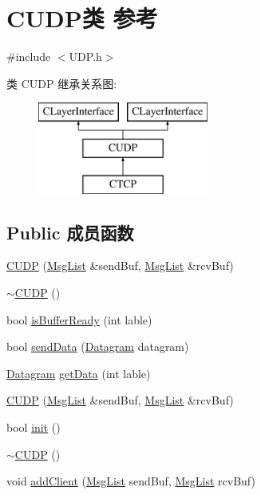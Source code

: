 \hypertarget{class_c_u_d_p}{}\section{C\+U\+D\+P类 参考}
\label{class_c_u_d_p}


{\ttfamily \#include $<$U\+D\+P.\+h$>$}

类 C\+U\+DP 继承关系图\+:\begin{figure}[H]
\begin{center}
\leavevmode
\includegraphics[height=3.000000cm]{class_c_u_d_p}
\end{center}
\end{figure}
\subsection*{Public 成员函数}
\begin{DoxyCompactItemize}
\item 
\hyperlink{class_c_u_d_p_a2eed7862494fbdc41005e5f536d2f74f}{C\+U\+DP} (\hyperlink{class_msg_list}{Msg\+List} \&send\+Buf, \hyperlink{class_msg_list}{Msg\+List} \&rcv\+Buf)
\item 
\hyperlink{class_c_u_d_p_aa5e4b24a48885c739893d60ffb10672f}{$\sim$\+C\+U\+DP} ()
\item 
bool \hyperlink{class_c_u_d_p_af595428bc531576d9859a9e0b84d03d9}{is\+Buffer\+Ready} (int lable)
\item 
bool \hyperlink{class_c_u_d_p_a1f6e555ad4997b283e68ebfa7dc0d263}{send\+Data} (\hyperlink{class_datagram}{Datagram} datagram)
\item 
\hyperlink{class_datagram}{Datagram} \hyperlink{class_c_u_d_p_aa71e49c760769b55dc2251b244eb00ff}{get\+Data} (int lable)
\item 
\hyperlink{class_c_u_d_p_a2eed7862494fbdc41005e5f536d2f74f}{C\+U\+DP} (\hyperlink{class_msg_list}{Msg\+List} \&send\+Buf, \hyperlink{class_msg_list}{Msg\+List} \&rcv\+Buf)
\item 
bool \hyperlink{class_c_u_d_p_a08619144028e752736166988369598c4}{init} ()
\item 
\hyperlink{class_c_u_d_p_aa5e4b24a48885c739893d60ffb10672f}{$\sim$\+C\+U\+DP} ()
\item 
void \hyperlink{class_c_u_d_p_a32181d9f38654f9480193af29fc221eb}{add\+Client} (\hyperlink{class_msg_list}{Msg\+List} send\+Buf, \hyperlink{class_msg_list}{Msg\+List} rcv\+Buf)
\end{DoxyCompactItemize}
